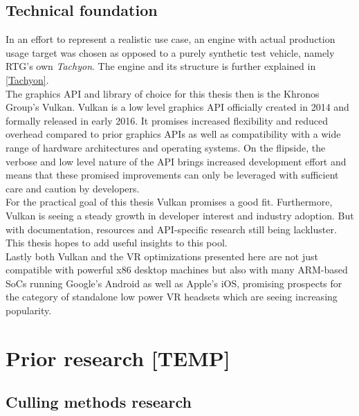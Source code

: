 \section{Technical foundation}
In an effort to represent a realistic use case, an engine with actual production usage target was chosen as opposed to a purely synthetic test vehicle, namely \gls{RTG}'s own \textit{\gls{Tachyon}}. The engine and its structure is further explained in \autoref{Tachyon}. \\
The graphics API and library of choice for this thesis then is the Khronos Group's Vulkan. Vulkan is a low level graphics API officially created in 2014 and formally released in early 2016. It promises increased flexibility and reduced overhead compared to prior graphics APIs as well as compatibility with a wide range of hardware architectures and operating systems\cite{TheKhronosGroupInc..2016}. On the flipside, the verbose and low level nature of the API brings increased development effort and means that these promised improvements can only be leveraged with sufficient care and caution by developers. \\
For the practical goal of this thesis Vulkan promises a good fit. Furthermore, Vulkan is seeing a steady growth in developer interest and industry adoption. But with documentation, resources and API-specific research still being lackluster. This thesis hopes to add useful insights to this pool. \\
Lastly both Vulkan and the \gls{VR} optimizations presented here are not just compatible with powerful x86 desktop machines but also with many ARM-based SoCs running Google's Android as well as Apple's iOS, promising prospects for the category of standalone low power \gls{VR} headsets which are seeing increasing popularity\cite{AntonyVitillo.2018}\cite{IDCCorporateUSA.2020}. 



\iffalse
\chapter{Prior research [TEMP]}\label{chapter:introduction}

\section{Culling methods research}
